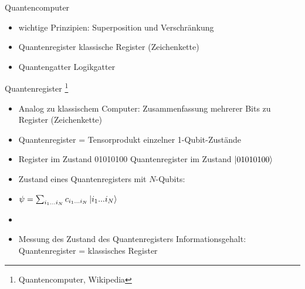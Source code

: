 \documentclass[aspectratio=1610, 9pt]{beamer}
\begin{document}
\begin{frame}{Quantencomputer}
  \begin{itemize}
    \item wichtige Prinzipien: Superposition und Verschränkung
    \item Quantenregister \leftarrow \rightarrow klassische Register (Zeichenkette)
    \item Quantengatter \leftarrow \rightarrow Logikgatter
  \end{itemize}
\end{frame}

\begin{frame}{Quantenregister \footnote[300]{Quantencomputer, Wikipedia}}
  \begin{itemize}
    \item Analog zu klassischem Computer: Zusammenfassung mehrerer Bits zu Register (Zeichenkette)
    \item[\rightarrow] Quantenregister = Tensorprodukt einzelner 1-Qubit-Zustände
    \item Register im Zustand 01010100 \rightarrow Quantenregister  im Zustand $\ket{01010100}$
    \item Zustand eines Quantenregisters mit $N$-Qubits:
    \item[] $\psi = \sum_{i_1 ...i_N} c_{i_1 ...i_N} \ket{i_1 ... i_N} $
    \item[]
    \item Messung des Zustand des Quantenregisters \rightarrow Informationsgehalt: Quantenregister = klassisches Register
  \end{itemize}
\end{frame}
\end{document}
